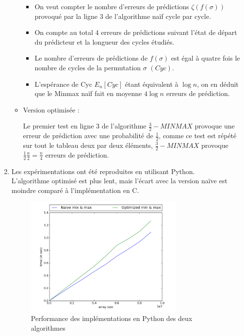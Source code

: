 \documentclass[paper=a4, fontsize=11pt]{scrartcl}
\numberwithin{equation}{section}		%
\numberwithin{figure}{section}			%
\numberwithin{table}{section}				%
\begin{document}
\begin{enumerate}
\begin{itemize}
\begin{itemize}[label=$\bullet$]
\item On veut compter le nombre d'erreurs de prédictions $\zeta(f(\sigma))$ provoqué par la ligne 3 de l'algorithme naïf cycle par cycle.
\item On compte au total 4 erreurs de prédictions suivant l'état de départ du prédicteur et la longueur des cycles étudiés.
\item Le nombre d'erreurs de prédictions de $f(\sigma)$ est égal à quatre fois le nombre de cycles de la permutation $\sigma$ $(Cyc)$.
\item L'espérance de Cyc $E_n[Cyc]$ étant équivalent à $\log n$, on en déduit que le Minmax naïf fait en moyenne $4\log n$ erreurs de prédiction.
\end{itemize}

\item Version optimisée : 

Le premier test en ligne 3 de l'algorithme $\frac{3}{2}-MINMAX$ provoque une erreur de prédiction avec une probabilité de
$\frac{1}{2}$, comme ce test est répété sur tout le tableau deux par deux éléments, $\frac{3}{2}-MINMAX$ provoque $\frac{1}{2} \frac{n}{2} = \frac{n}{4}$
erreurs de prédiction.
\end{itemize}


    \item Les expérimentations ont été reproduites en utilisant Python. \\
            L'algorithme optimisé est plus lent, mais l'écart avec la version naïve est moindre
            comparé à l'implémentation en C.

\begin{figure}[!ht]
  \caption{Performance des implémentations en Python des deux algorithmes}
\centering\includegraphics[width=0.75\textwidth]{minmax10m_py.png}
\end{figure}


\end{enumerate}
\end{document}
